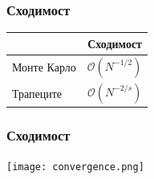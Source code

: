 \begin{frame}
  \frametitle{Сходимост}
  \begin{table}
  \begin{tabular}{l | c }
              & Сходимост    \\
  \hline \hline
  Монте Карло & $\mathcal{O}(N^{-1/2})$  \\
  \pause
  Трапеците   & $\mathcal{O}(N^{-2/s})$    \\
  \end{tabular}
  \end{table}
\end{frame}

\begin{frame}
  \frametitle{Сходимост}
    \texttt{[image: convergence.png]}
\end{frame}
